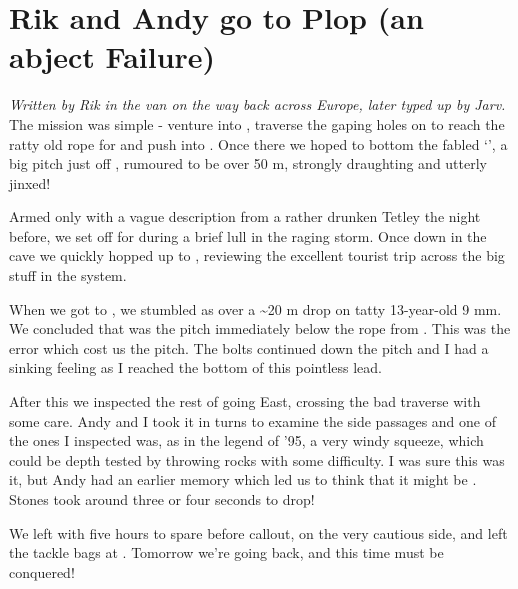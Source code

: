\section{Rik and Andy go to Plop (an abject
Failure)}


\textit{Written by Rik in the van on the way back across Europe, later typed up by Jarv.}\\

The mission was simple - venture into , traverse the gaping
holes on  to reach the ratty old rope for 
and push into . Once there we hoped to bottom the fabled
`', a big pitch just off , rumoured to be over 50 m,
strongly draughting and utterly jinxed!

Armed only with a vague description from a rather drunken Tetley the
night before, we set off for  during a brief lull in the
raging storm. Once down in the cave we quickly hopped up to ,
reviewing the excellent tourist trip across the big stuff in the system.

When we got to , we stumbled as  over a \textasciitilde{}20 m drop on tatty 13-year-old 9
mm. We concluded that  was the pitch immediately below the rope from
. This was the error which cost us the pitch. The bolts continued
down the pitch and I had a sinking feeling as I reached the bottom of
this pointless lead.

After this we inspected the rest of  going East, crossing the
bad traverse with some care. Andy and I took it in turns to examine the
side passages and one of the ones I inspected was, as in the legend of
'95, a very windy squeeze, which could be depth tested by throwing rocks
with some difficulty. I was sure this was it, but Andy had an earlier
memory which led us to think that it might be . Stones took
around three or four seconds to drop!

We left with five hours to spare before callout, on the very cautious
side, and left the tackle bags at . Tomorrow we're going back,
and this time  must be conquered!


